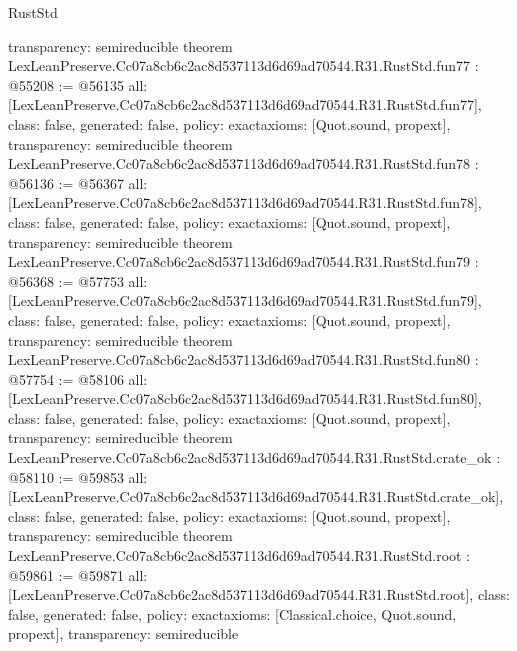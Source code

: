 \begin{lexlean}{RustStd}
\begin{coremodule}
{  transparency: semireducible
}
theorem LexLeanPreserve.Cc07a8cb6c2ac8d537113d6d69ad70544.R31.RustStd.fun77 : @55208 := @56135 {
  all: [LexLeanPreserve.Cc07a8cb6c2ac8d537113d6d69ad70544.R31.RustStd.fun77],
  class: false,
  generated: false,
  policy: exact{axioms: [Quot.sound, propext]},
  transparency: semireducible
}
theorem LexLeanPreserve.Cc07a8cb6c2ac8d537113d6d69ad70544.R31.RustStd.fun78 : @56136 := @56367 {
  all: [LexLeanPreserve.Cc07a8cb6c2ac8d537113d6d69ad70544.R31.RustStd.fun78],
  class: false,
  generated: false,
  policy: exact{axioms: [Quot.sound, propext]},
  transparency: semireducible
}
theorem LexLeanPreserve.Cc07a8cb6c2ac8d537113d6d69ad70544.R31.RustStd.fun79 : @56368 := @57753 {
  all: [LexLeanPreserve.Cc07a8cb6c2ac8d537113d6d69ad70544.R31.RustStd.fun79],
  class: false,
  generated: false,
  policy: exact{axioms: [Quot.sound, propext]},
  transparency: semireducible
}
theorem LexLeanPreserve.Cc07a8cb6c2ac8d537113d6d69ad70544.R31.RustStd.fun80 : @57754 := @58106 {
  all: [LexLeanPreserve.Cc07a8cb6c2ac8d537113d6d69ad70544.R31.RustStd.fun80],
  class: false,
  generated: false,
  policy: exact{axioms: [Quot.sound, propext]},
  transparency: semireducible
}
theorem LexLeanPreserve.Cc07a8cb6c2ac8d537113d6d69ad70544.R31.RustStd.crate_ok : @58110 := @59853 {
  all: [LexLeanPreserve.Cc07a8cb6c2ac8d537113d6d69ad70544.R31.RustStd.crate_ok],
  class: false,
  generated: false,
  policy: exact{axioms: [Quot.sound, propext]},
  transparency: semireducible
}
theorem LexLeanPreserve.Cc07a8cb6c2ac8d537113d6d69ad70544.R31.RustStd.root : @59861 := @59871 {
  all: [LexLeanPreserve.Cc07a8cb6c2ac8d537113d6d69ad70544.R31.RustStd.root],
  class: false,
  generated: false,
  policy: exact{axioms: [Classical.choice, Quot.sound, propext]},
  transparency: semireducible
}


\end{coremodule}
\end{lexlean}
